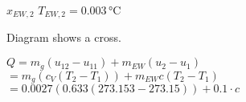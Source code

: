 \( x_{EW,2} \)  
\( T_{EW,2} = 0.003 \, \text{°C} \)  

Diagram shows a cross.  

\( Q = m_g (u_{12} - u_{11}) + m_{EW} (u_2 - u_1) \)  
\( = m_g (c_V (T_2 - T_1)) + m_{EW} c (T_2 - T_1) \)  
\( = 0.0027 (0.633 (273.153 - 273.15)) + 0.1 \cdot c \)